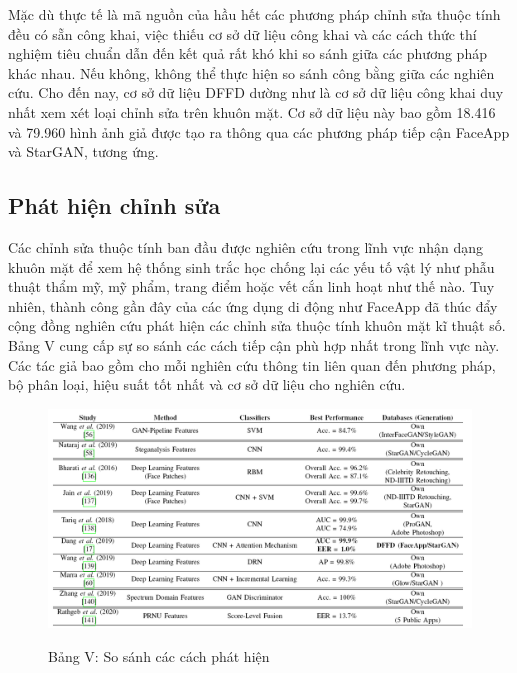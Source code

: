 \documentclass{article}
\begin{document}
Mặc dù thực tế là mã nguồn của hầu hết các phương pháp chỉnh sửa thuộc tính đều có sẵn công khai, việc thiếu cơ sở dữ liệu công khai và các cách thức thí nghiệm tiêu chuẩn dẫn đến kết quả rất khó khi so sánh giữa các phương pháp khác nhau. Nếu không, không thể thực hiện so sánh công bằng giữa các nghiên cứu. Cho đến nay, cơ sở dữ liệu DFFD  dường như là cơ sở dữ liệu công khai duy nhất xem xét loại chỉnh sửa trên khuôn mặt. Cơ sở dữ liệu này bao gồm 18.416 và 79.960 hình ảnh giả được tạo ra thông qua các phương pháp tiếp cận FaceApp và StarGAN, tương ứng.

\subsection{Phát hiện chỉnh sửa}

Các chỉnh sửa thuộc tính ban đầu được nghiên cứu trong lĩnh vực nhận dạng khuôn mặt để xem hệ thống sinh trắc học chống lại các yếu tố vật lý như phẫu thuật thẩm mỹ, mỹ phẩm, trang điểm hoặc vết cắn linh hoạt như thế nào. Tuy nhiên, thành công gần đây của các ứng dụng di động như FaceApp đã thúc đẩy cộng đồng nghiên cứu phát hiện các chỉnh sửa thuộc tính khuôn mặt kĩ thuật số. Bảng V cung cấp sự so sánh các cách tiếp cận phù hợp nhất trong lĩnh vực này. Các tác giả bao gồm cho mỗi nghiên cứu thông tin liên quan đến phương pháp, bộ phân loại, hiệu suất tốt nhất và cơ sở dữ liệu cho nghiên cứu.


\begin{figure}[h!]
\caption{Bảng V: So sánh các cách phát hiện}
\includegraphics[width=\columnwidth]{table-5-compare}
\label{table-5-compare}
\end{figure}
\end{document}
